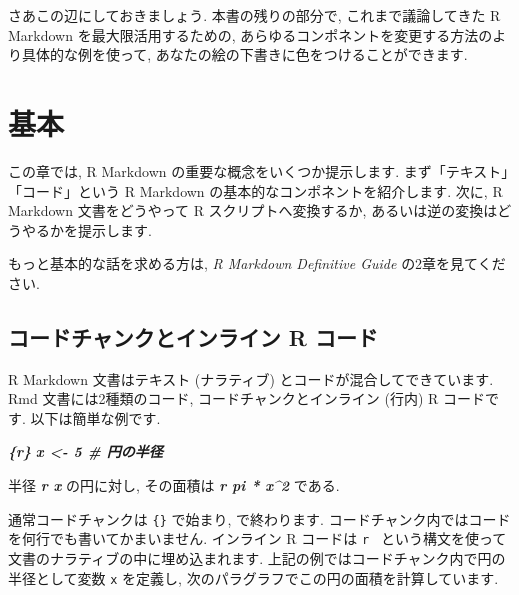 \documentclass[
  11pt,
  lualatex,
  ja=standard]{bxjsreport}
\newenvironment{Shaded}{\begin{snugshade}}{\end{snugshade}}
\newcommand{\InformationTok}[1]{\textcolor[rgb]{0.56,0.35,0.01}{\textbf{\textit{#1}}}}
\newcommand{\NormalTok}[1]{#1}
\begin{document}
さあこの辺にしておきましょう. 本書の残りの部分で, これまで議論してきた R Markdown を最大限活用するための, あらゆるコンポネントを変更する方法のより具体的な例を使って, あなたの絵の下書きに色をつけることができます.

\hypertarget{basics}{%
\chapter{基本}\label{basics}}

この章では, R Markdown の重要な概念をいくつか提示します. まず「テキスト」「コード」という R Markdown の基本的なコンポネントを紹介します. 次に, R Markdown 文書をどうやって R スクリプトへ変換するか, あるいは逆の変換はどうやるかを提示します.

もっと基本的な話を求める方は, \emph{R Markdown Definitive Guide} \autocite{rmarkdown2018} の2章を見てください.

\hypertarget{r-code}{%
\section{コードチャンクとインライン R コード}\label{r-code}}

R Markdown 文書はテキスト (ナラティブ) とコードが混合してできています. Rmd 文書には2種類のコード, コードチャンクとインライン (行内) R コードです. 以下は簡単な例です.

\begin{Shaded}
\begin{Highlighting}[]
\InformationTok{\textasciigrave{}\textasciigrave{}\textasciigrave{}\{r\}}
\InformationTok{x \textless{}{-} 5  \# 円の半径}
\InformationTok{\textasciigrave{}\textasciigrave{}\textasciigrave{}}

\NormalTok{半径 }\InformationTok{\textasciigrave{}r x\textasciigrave{}}\NormalTok{ の円に対し,}
\NormalTok{その面積は }\InformationTok{\textasciigrave{}r pi * x\^{}2\textasciigrave{}}\NormalTok{ である.}
\end{Highlighting}
\end{Shaded}

通常コードチャンクは \texttt{\textasciigrave{}\textasciigrave{}\textasciigrave{}\{\}} で始まり, \texttt{\textasciigrave{}\textasciigrave{}\textasciigrave{}} で終わります. コードチャンク内ではコードを何行でも書いてかまいません. インライン R コードは \texttt{\textasciigrave{}r\ \textasciigrave{}} という構文を使って文書のナラティブの中に埋め込まれます. 上記の例ではコードチャンク内で円の半径として変数 \texttt{x} を定義し, 次のパラグラフでこの円の面積を計算しています.
\end{document}
